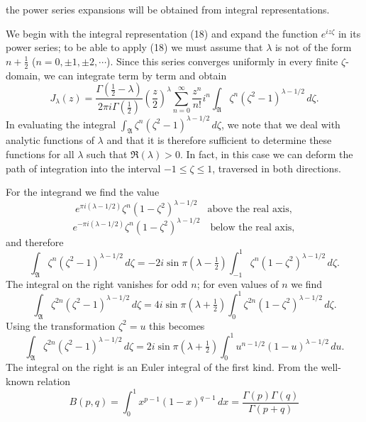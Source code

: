 the power series expansions will be obtained from integral representations.

We begin with the integral representation (18) and expand the function $e^{iz\zeta}$ in its power series; to be able to apply (18) we must assume that $\lambda$ is not of the form $n+\tfrac12$ ($n=0,\pm1,\pm2,\cdots$). Since this series converges uniformly in every finite $\zeta$-domain, we can integrate term by term and obtain
\[
J_\lambda(z)=\frac{\Gamma(\tfrac12-\lambda)}{2\pi i\Gamma(\tfrac12)}
\left(\frac z2\right)^\lambda
\sum_{n=0}^{\infty}\frac{z^n}{n!}i^n
\int_{\mathfrak A}\zeta^n(\zeta^2-1)^{\lambda-1/2}\,d\zeta.
\]
In evaluating the integral $\int_{\mathfrak A}\zeta^n(\zeta^2-1)^{\lambda-1/2}\,d\zeta$, we note that we deal with analytic functions of $\lambda$ and that it is therefore sufficient to determine these functions for all $\lambda$ such that $\Re(\lambda)>0$. In fact, in this case we can deform the path of integration into the interval $-1\le\zeta\le1$, traversed in both directions.

For the integrand we find the value
\[
e^{\pi i(\lambda-1/2)}\zeta^n(1-\zeta^2)^{\lambda-1/2}\quad\text{above the real axis},
\]
\[
e^{-\pi i(\lambda-1/2)}\zeta^n(1-\zeta^2)^{\lambda-1/2}\quad\text{below the real axis},
\]
and therefore
\[
\int_{\mathfrak A}\zeta^n(\zeta^2-1)^{\lambda-1/2}\,d\zeta
=-2i\sin\pi\left(\lambda-\tfrac12\right)
\int_{-1}^{1}\zeta^n(1-\zeta^2)^{\lambda-1/2}\,d\zeta.
\]
The integral on the right vanishes for odd $n$; for even values of $n$ we find
\[
\int_{\mathfrak A}\zeta^{2n}(\zeta^2-1)^{\lambda-1/2}\,d\zeta
=4i\sin\pi\left(\lambda+\tfrac12\right)
\int_0^1\zeta^{2n}(1-\zeta^2)^{\lambda-1/2}\,d\zeta.
\]
Using the transformation $\zeta^2=u$ this becomes
\[
\int_{\mathfrak A}\zeta^{2n}(\zeta^2-1)^{\lambda-1/2}\,d\zeta
=2i\sin\pi\left(\lambda+\tfrac12\right)
\int_0^1u^{n-1/2}(1-u)^{\lambda-1/2}\,du.
\]
The integral on the right is an Euler integral of the first kind. From the well-known relation
\[
B(p,q)=\int_0^1x^{p-1}(1-x)^{q-1}\,dx=\frac{\Gamma(p)\Gamma(q)}{\Gamma(p+q)}
\]

